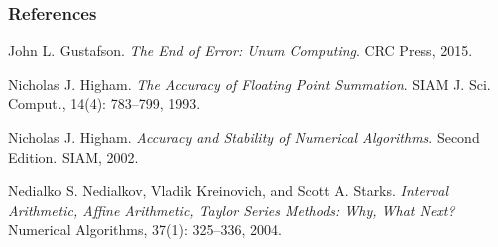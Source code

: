 \begin{frame}

\frametitle{References}

\footnotesize

\begin{thebibliography}{9}

 John L. Gustafson. \emph{The End of
Error: Unum Computing}. CRC Press, 2015.

 Nicholas J. Higham. \emph{The Accuracy of
Floating Point Summation}. SIAM J. Sci. Comput., 14(4): 783--799, 1993.

 Nicholas J. Higham. \emph{Accuracy and
Stability of Numerical Algorithms}. Second Edition. SIAM, 2002.

 Nedialko S. Nedialkov,
Vladik Kreinovich, and Scott A. Starks. \emph{Interval Arithmetic, Affine
Arithmetic, Taylor Series Methods: Why, What Next?} Numerical Algorithms,
37(1): 325--336, 2004.

\end{thebibliography}

\end{frame}
